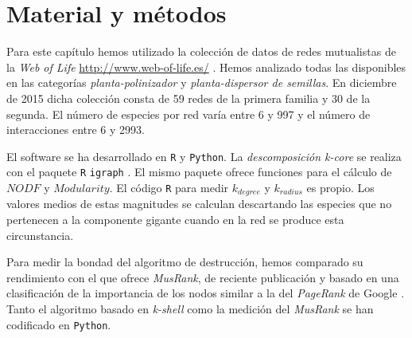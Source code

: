 \section{Material y métodos}

Para este capítulo hemos utilizado la colección de datos de redes mutualistas de la \textit{Web of Life}  \url{http://www.web-of-life.es/} \cite{fortuna2014web}. Hemos analizado todas las disponibles en las categorías \textit{planta-polinizador} y \textit{planta-dispersor de semillas}. En diciembre de 2015 dicha colección consta de 59 redes de la primera familia y 30 de la segunda. El número de especies por red varía entre 6 y 997 y el número de interacciones entre 6 y 2993.

El software se ha desarrollado en \texttt{R} y \texttt{Python}. La \textit{descomposición k-core} se realiza con el paquete \texttt{R} \texttt{igraph} \cite{csardi2006igraph}. El mismo paquete ofrece funciones para el cálculo de $NODF$ y $Modularity$. El código \texttt{R} para medir ${k}_{degree}$ y ${k}_{radius}$ es propio. Los valores medios de estas magnitudes se calculan descartando las especies que no pertenecen a la componente gigante cuando en la red se produce esta circunstancia. 

Para medir la bondad del algoritmo de destrucción, hemos comparado su rendimiento con el que ofrece \textit{MusRank}, de reciente publicación y basado en una clasificación de la importancia de los nodos similar a la del \textit{PageRank} de Google  \citep{dominguez2015ranking}. Tanto el algoritmo basado en \textit{k-shell} como la medición del \textit{MusRank} se han codificado en \texttt{Python}.

